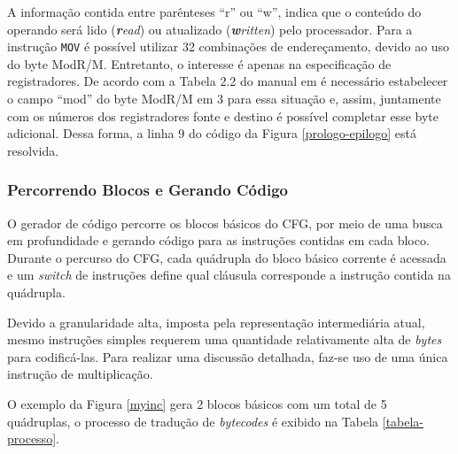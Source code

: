 A informação contida entre parênteses ``r'' ou ``w'', indica
que o conteúdo do operando será lido
(\textit{\textbf{r}ead}) ou atualizado
(\textit{\textbf{w}ritten}) pelo processador.%
 Para a
instrução \verb!MOV! é possível utilizar 32 combinações de
endereçamento, devido ao uso do byte ModR/M. Entretanto, o interesse é
apenas na especificação de registradores. De acordo com a
Tabela 2.2 do manual em 
é necessário estabelecer o campo ``mod'' do byte ModR/M em 3 para
essa situação e, assim, juntamente com os números dos registradores fonte e
destino é possível completar esse byte adicional. Dessa forma, a
linha 9 do código da Figura \ref{prologo-epilogo} está resolvida.


\subsubsection{Percorrendo Blocos e Gerando Código}

O gerador de código percorre os blocos básicos do CFG, por meio de uma
busca em profundidade e gerando código para as instruções contidas em
cada bloco. Durante o percurso do CFG, cada quádrupla
do bloco básico corrente é acessada e um
\textit{switch} de instruções define qual cláusula corresponde a
instrução contida na quádrupla.%

Devido a granularidade alta, imposta pela representação intermediária
atual, mesmo instruções simples requerem uma quantidade
relativamente alta de \textit{bytes} para codificá-las. Para realizar
uma discussão detalhada, faz-se uso de uma única instrução de
multiplicação.

O exemplo da Figura \ref{myinc} gera 2 blocos básicos com um total de 5
quádruplas, o processo de tradução de \textit{bytecodes} é exibido na
Tabela \ref{tabela-processo}.

